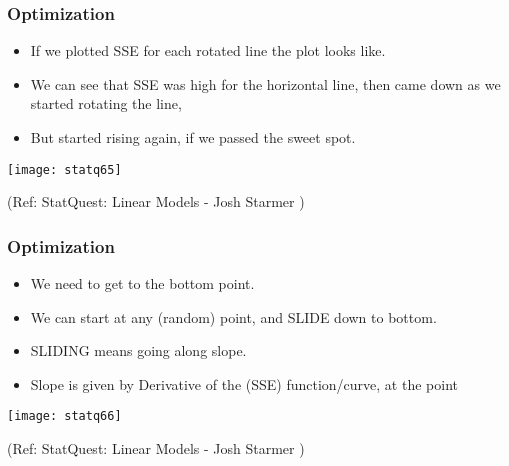 \begin{frame}[fragile]\frametitle{Optimization}
\begin{itemize}
\item If we plotted SSE for each rotated line the plot looks like. 
\item We can see that SSE was high for the horizontal line, then came down as we started rotating the line, 
\item But started rising again, if we passed the sweet spot.
\end{itemize}

\begin{center}
\texttt{[image: statq65]}
\end{center}

\tiny{(Ref: StatQuest: Linear Models - Josh Starmer )}	

\end{frame}






\begin{frame}[fragile]\frametitle{Optimization}
\begin{itemize}
\item We need to get to the bottom point.
\item We can start at any (random) point, and SLIDE down to bottom.
\item SLIDING means going along slope. 
\item Slope is given by Derivative of the (SSE) function/curve, at the point 
\end{itemize}

\begin{center}
\texttt{[image: statq66]}
\end{center}

\tiny{(Ref: StatQuest: Linear Models - Josh Starmer )}	

\end{frame}

